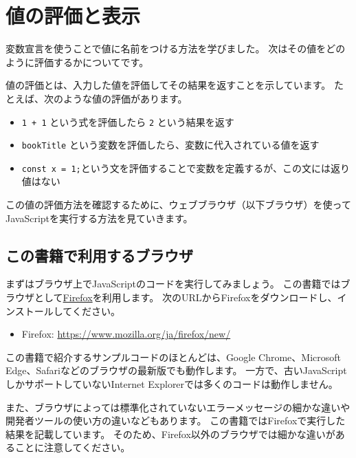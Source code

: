 \hypertarget{read-eval-print}{%
\chapter{値の評価と表示}\label{read-eval-print}}
\thispagestyle{frontheadings}

変数宣言を使うことで値に名前をつける方法を学びました。
次はその値をどのように評価するかについてです。

値の評価とは、入力した値を評価してその結果を返すことを示しています。
たとえば、次のような値の評価があります。

\begin{itemize}
\item
  \texttt{1 + 1} という式を評価したら
  \texttt{2} という結果を返す
\item
  \texttt{bookTitle}
  という変数を評価したら、変数に代入されている値を返す
\item
  \texttt{const x = 1;}という文を評価することで変数を定義するが、この文には返り値はない
\end{itemize}

この値の評価方法を確認するために、ウェブブラウザ（以下ブラウザ）を使ってJavaScriptを実行する方法を見ていきます。

\hypertarget{recommended-browser}{%
\section{この書籍で利用するブラウザ}\label{recommended-browser}}

まずはブラウザ上でJavaScriptのコードを実行してみましょう。
この書籍ではブラウザとして\href{https://www.mozilla.org/ja/firefox/new/}{Firefox}を利用します。
次のURLからFirefoxをダウンロードし、インストールしてください。

\begin{itemize}
\item
  Firefox: \url{https://www.mozilla.org/ja/firefox/new/}
\end{itemize}

この書籍で紹介するサンプルコードのほとんどは、Google Chrome、Microsoft
Edge、Safariなどのブラウザの最新版でも動作します。
一方で、古いJavaScriptしかサポートしていないInternet
Explorerでは多くのコードは動作しません。

また、ブラウザによっては標準化されていないエラーメッセージの細かな違いや開発者ツールの使い方の違いなどもあります。
この書籍ではFirefoxで実行した結果を記載しています。
そのため、Firefox以外のブラウザでは細かな違いがあることに注意してください。

